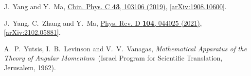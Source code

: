 \documentclass[graybox, secnum]{svmult}
\begin{document}
\begin{thebibliography}{99}
J.~Yang and Y.~Ma, %
  \href{http://dx.doi.org/10.1088/1674-1137/43/10/103106}{Chin. Phys. C
  {\bfseries 43}, 103106 (2019)},
  [\href{http://arxiv.org/abs/1908.10600}{arXiv:1908.10600}].

J.~Yang, C.~Zhang and Y.~Ma, %
  \href{http://dx.doi.org/10.1103/PhysRevD.104.044025}{Phys. Rev. D {\bfseries
  104}, 044025 (2021)},
  [\href{http://arxiv.org/abs/2102.05881}{arXiv:2102.05881}].

A.~P.~Yutsis, I.~B.~Levinson and V.~V.~Vanagas, {\em Mathematical Apparatus of the
	Theory of Angular Momentum} (Israel Program for Scientific Translation,
	Jerusalem, 1962).

\end{thebibliography}
\end{document}
